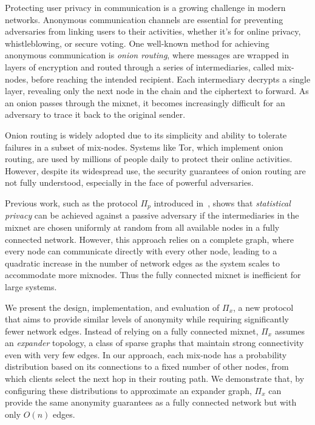 Protecting user privacy in communication is a growing challenge in modern networks. Anonymous communication channels are essential for preventing adversaries from linking users to their activities, whether it's for online privacy, whistleblowing, or secure voting. One well-known method for achieving anonymous communication is \textit{onion routing}, where messages are wrapped in layers of encryption and routed through a series of intermediaries, called mix-nodes, before reaching the intended recipient. Each intermediary decrypts a single layer, revealing only the next node in the chain and the ciphertext to forward. As an onion passes through the mixnet, it becomes increasingly difficult for an adversary to trace it back to the original sender. 

Onion routing is widely adopted due to its simplicity and ability to tolerate failures in a subset of mix-nodes. Systems like Tor, which implement onion routing, are used by millions of people daily to protect their online activities. However, despite its widespread use, the security guarantees of onion routing are not fully understood, especially in the face of powerful adversaries.

Previous work, such as the protocol $\Pi_p$ introduced in~\cite{ICALP:AndLysUpf18}, shows that \textit{statistical privacy} can be achieved against a passive adversary if the intermediaries in the mixnet are chosen uniformly at random from all available nodes in a fully connected network. However, this approach relies on a complete graph, where every node can communicate directly with every other node, leading to a quadratic increase in the number of network edges as the system scales to accommodate more mixnodes. Thus the fully connected mixnet is inefficient for large systems.

We present the design, implementation, and evaluation of $\Pi_x$, a new protocol that aims to provide similar levels of anonymity while requiring significantly fewer network edges. Instead of relying on a fully connected mixnet, $\Pi_x$ assumes an \textit{expander} topology, a class of sparse graphs that maintain strong connectivity even with very few edges. In our approach, each mix-node has a probability distribution based on its connections to a fixed number of other nodes, from which clients select the next hop in their routing path. We demonstrate that, by configuring these distributions to approximate an expander graph, $\Pi_x$ can provide the same anonymity guarantees as a fully connected network but with only $O(n)$ edges.

